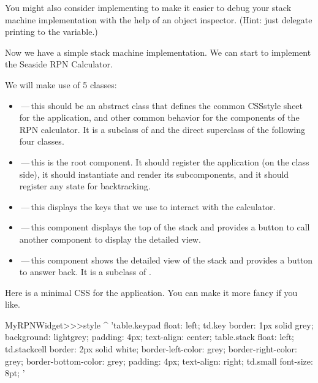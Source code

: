 \documentclass[a4paper,10pt,twoside]{book}
\begin{document}
You might also consider implementing  to make it easier to
debug your stack machine implementation with the help of an object inspector.
(Hint: just delegate printing to the  variable.)


Now we have a simple stack machine implementation.
We can start to implement the Seaside RPN Calculator.

We will make use of 5 classes:
\begin{itemize}
\item {}\,---\,this should be an abstract class that defines the common CSSstyle sheet for the application, and other common behavior for the components of the RPN
calculator.
It is a subclass of  and the direct superclass of the following four
classes.
  
    \item {}\,---\,this is the root component.
It should register the application (on the class side), it should instantiate and render
its subcomponents, and it should register any state for backtracking.
\item {}\,---\,this displays the keys that we use to interact with the
calculator.
\item {}\,---\,this component displays the top of the stack and provides a
button to call another component to display the detailed view.
\item {}\,---\,this component shows the detailed view of the stack and
provides a button to answer back.
  It is a subclass of .
\end{itemize}


Here is a minimal CSS for the application.
You can make it more fancy if you like.
\begin{code}{}
MyRPNWidget>>>style
	^ 'table.keypad { float: left; }
td.key {
	border: 1px solid grey;
	background: lightgrey;
	padding: 4px;
	text-align: center;
}
table.stack { float: left; }
td.stackcell {
	border: 2px solid white;
	border-left-color: grey;
	border-right-color: grey;
	border-bottom-color: grey;
	padding: 4px;
	text-align: right;
}
td.small { font-size: 8pt; }'
\end{code}
\end{document}
